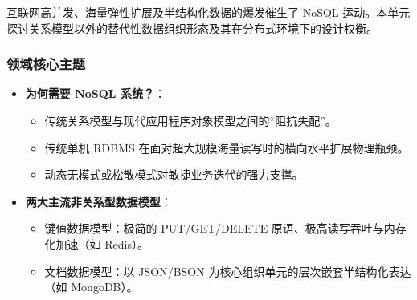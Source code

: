互联网高并发、海量弹性扩展及半结构化数据的爆发催生了 NoSQL 运动。本单元探讨关系模型以外的替代性数据组织形态及其在分布式环境下的设计权衡。

\subsubsection{领域核心主题}
\begin{itemize}
    \item \textbf{为何需要 NoSQL 系统？}：
    \begin{itemize}
        \item 传统关系模型与现代应用程序对象模型之间的“阻抗失配”。
        \item 传统单机 RDBMS 在面对超大规模海量读写时的横向水平扩展物理瓶颈。
        \item 动态无模式或松散模式对敏捷业务迭代的强力支撑。
    \end{itemize}
    \item \textbf{两大主流非关系型数据模型}：
    \begin{itemize}
        \item 键值数据模型：极简的 PUT/GET/DELETE 原语、极高读写吞吐与内存化加速（如 Redis）。
        \item 文档数据模型：以 JSON/BSON 为核心组织单元的层次嵌套半结构化表达（如 MongoDB）。
    \end{itemize}
\end{itemize}

